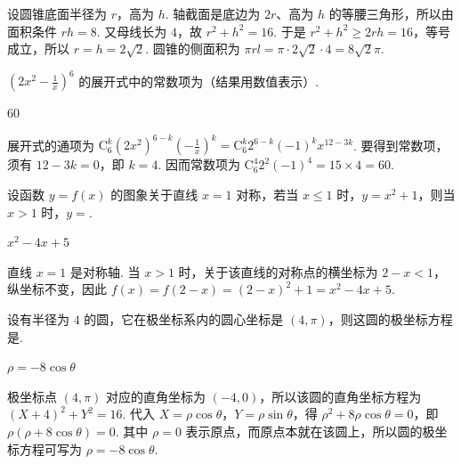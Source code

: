 \documentclass[UTF8,a4paper,oneside,11pt]{ctexbook}
\begin{document}
\begin{solution}
设圆锥底面半径为 \(r\)，高为 \(h\). 轴截面是底边为 \(2r\)、高为 \(h\) 的等腰三角形，所以由面积条件 \(rh=8\). 又母线长为 \(4\)，故 \(r^2+h^2=16\). 于是
\(r^2+h^2\geqslant2rh=16\)，等号成立，所以 \(r=h=2\sqrt2\). 圆锥的侧面积为 \(\pi rl=\pi\cdot2\sqrt2\cdot4=8\sqrt2\pi\).
\end{solution}

\begin{problem}
\(\left(2x^2 - \frac{1}{x}\right)^6\) 的展开式中的常数项为\fillinblank{}（结果用数值表示）.
\end{problem}

\begin{answer}
\(60\)
\end{answer}

\begin{solution}
展开式的通项为
\(\displaystyle\mathrm C_6^k(2x^2)^{6-k}\left(-\frac1x\right)^k=\mathrm C_6^k2^{6-k}(-1)^kx^{12-3k}\). 要得到常数项，须有 \(12-3k=0\)，即 \(k=4\). 因而常数项为
\(\displaystyle\mathrm C_6^4 2^2(-1)^4=15\times4=60\).
\end{solution}

\begin{problem}
设函数 \(y = f(x)\) 的图象关于直线 \(x = 1\) 对称，若当 \(x \leqslant 1\) 时，\(y = x^2 + 1\)，则当 \(x > 1\) 时，\(y = \)\fillinblank{}.
\end{problem}

\begin{answer}
\(x^2 - 4x + 5\)
\end{answer}

\begin{solution}
直线 \(x=1\) 是对称轴. 当 \(x>1\) 时，关于该直线的对称点的横坐标为 \(2-x<1\)，纵坐标不变，因此
\(f(x)=f(2-x)=(2-x)^2+1=x^2-4x+5\).
\end{solution}

\begin{problem}
设有半径为 \(4\) 的圆，它在极坐标系内的圆心坐标是 \((4,\pi)\)，则这圆的极坐标方程是\fillinblank{}.
\end{problem}

\begin{answer}
\(\rho = -8\cos \theta\)
\end{answer}

\begin{solution}
极坐标点 \((4,\pi)\) 对应的直角坐标为 \((-4,0)\)，所以该圆的直角坐标方程为 \((X+4)^2+Y^2=16\). 代入 \(X=\rho\cos\theta\)，\(Y=\rho\sin\theta\)，得
\(\rho^2+8\rho\cos\theta=0\)，即 \(\rho(\rho+8\cos\theta)=0\). 其中 \(\rho=0\) 表示原点，而原点本就在该圆上，所以圆的极坐标方程可写为 \(\rho=-8\cos\theta\).
\end{solution}
\end{document}

